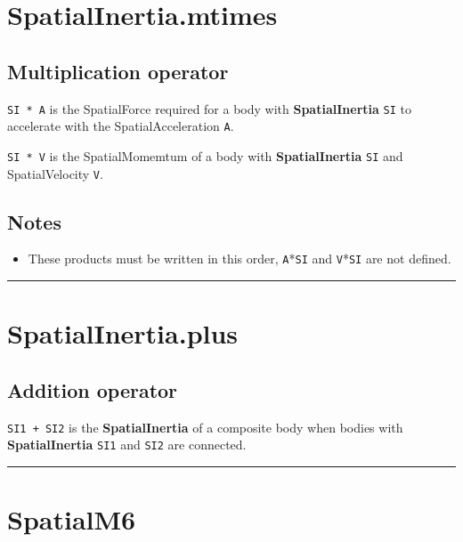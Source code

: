 \hypertarget{SpatialInertia.mtimes}{\section*{SpatialInertia.mtimes}}
\subsection*{Multiplication operator}


\texttt{SI * A} is the SpatialForce required for a body with \textbf{\color{red} SpatialInertia} \texttt{SI} to accelerate with
the SpatialAcceleration \texttt{A}.



\texttt{SI * V} is the SpatialMomemtum of a body with \textbf{\color{red} SpatialInertia} \texttt{SI} and SpatialVelocity \texttt{V}.


\subsection*{Notes}
\begin{itemize}
  \item These products must be written in this order, \texttt{A}*\texttt{SI} and \texttt{V}*\texttt{SI} are not defined.
\end{itemize}
\vspace{1.5ex}\hrule

\hypertarget{SpatialInertia.plus}{\section*{SpatialInertia.plus}}
\subsection*{Addition operator}


\texttt{SI1 + SI2} is the \textbf{\color{red} SpatialInertia} of a composite body when bodies with \textbf{\color{red} SpatialInertia} \texttt{SI1} and \texttt{SI2}
are connected.

\vspace{1.5ex}\rule{\textwidth}{1mm}

\hypertarget{SpatialM6}{\section*{SpatialM6}}
